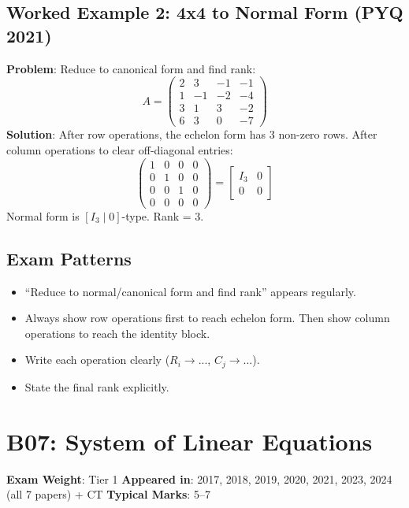\documentclass[
]{article}
\providecommand{\tightlist}{%
  \setlength{\itemsep}{0pt}\setlength{\parskip}{0pt}}
\renewenvironment{quote}
  {\begin{tcolorbox}[
     colback=calloutbg,
     colframe=calloutframe,
     colupper=callouttext,
     arc=3pt,
     boxrule=0.5pt,
     leftrule=0.5pt,
     borderline west={3pt}{0pt}{calloutaccent},
     left=8pt,
     right=8pt,
     top=6pt,
     bottom=6pt
   ]}
  {\end{tcolorbox}}
\begin{document}
\subsection{Worked Example 2: 4x4 to Normal Form (PYQ
2021)}\label{worked-example-2-4x4-to-normal-form-pyq-2021}

\textbf{Problem}: Reduce to canonical form and find rank:
\[
A =
\begin{pmatrix}
2 & 3 & -1 & -1 \\
1 & -1 & -2 & -4 \\
3 & 1 & 3 & -2 \\
6 & 3 & 0 & -7
\end{pmatrix}
\]
\textbf{Solution}: After row operations, the echelon form has 3 non-zero
rows. After column operations to clear off-diagonal entries:
\[
\begin{pmatrix}
1 & 0 & 0 & 0 \\
0 & 1 & 0 & 0 \\
0 & 0 & 1 & 0 \\
0 & 0 & 0 & 0
\end{pmatrix} = \begin{bmatrix} I_3 & 0 \\ 0 & 0 \end{bmatrix}
\]
Normal form is \([I_3 \mid 0]\)-type. Rank = 3.

\subsection{Exam Patterns}\label{exam-patterns-21}

\begin{itemize}
\tightlist
\item
  ``Reduce to normal/canonical form and find rank'' appears regularly.
\item
  Always show row operations first to reach echelon form. Then show
  column operations to reach the identity block.
\item
  Write each operation clearly (\(R_i \to ...\), \(C_j \to ...\)).
\item
  State the final rank explicitly.
\end{itemize}

\section{B07: System of Linear
Equations}\label{b07-system-of-linear-equations}

\begin{quote}
\textbf{Exam Weight}: Tier 1 \textbar{} \textbf{Appeared in}: 2017,
2018, 2019, 2020, 2021, 2023, 2024 (all 7 papers) + CT \textbar{}
\textbf{Typical Marks}: 5--7
\end{quote}
\end{document}
